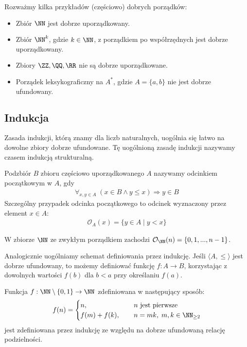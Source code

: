 \begin{example}
    Rozważmy kilka przykładów (częściowo) dobrych porządków:
    \begin{itemize}
        \item Zbiór $\NN$ jest dobrze uporządkowany.
        \item Zbiór $\NN^k$, gdzie $k \in \NN$, z porządkiem po współrzędnych jest dobrze uporządkowany.
        \item Zbiory $\ZZ, \QQ, \RR$ nie są dobrze uporządkowane.
        \item Porządek leksykograficzny na $A^*$, gdzie $A = \{a, b\}$ nie jest dobrze ufundowany.
    \end{itemize}
\end{example}

\subsection{Indukcja}
Zasada indukcji, którą znamy dla liczb naturalnych, uogólnia się łatwo na dowolne zbiory dobrze ufundowane. Tę uogólnioną zasadę indukcji nazywamy czasem indukcją strukturalną.

Podzbiór $B$ zbioru częściowo uporządkowanego $A$ nazywamy odcinkiem początkowym w $A$, gdy
\begin{align*}
    \forall_{x, y \in A} \; (x \in B \land y \leq x) \Rightarrow y \in B
\end{align*}
Szczególny przypadek odcinka początkowego to odcinek wyznaczony przez element $x \in A$:
\begin{align*}
    \mathcal{O}_A(x) = \{ y \in A \; | \; y < x \}
\end{align*}

\begin{example}
    W zbiorze $\NN$ ze zwykłym porządkiem zachodzi $\mathcal{O}_{\NN}(n) = \{0, 1, ..., n - 1\}$.
\end{example}

Analogicznie uogólniamy schemat definiowania przez indukcję. Jeśli $\langle A, \leq \rangle$ jest dobrze ufundowany, to możemy definiować funkcję $f: A \to B$, korzystając z dowolnych wartości $f (b)$ dla $b < a$ przy określaniu $f(a)$.

\begin{example}
    Funkcja $f: \NN \setminus \{0, 1\} \to \NN$ zdefiniowana w następujący sposób:
    \begin{align*}
        f(n) = \begin{cases}
            n, \hspace{60pt} & n \text{ jest pierwsze} \\
            f(m) + f(k), & n = mk, \; m, k \in \NN_{\geq 2}
        \end{cases}
    \end{align*}
jest zdefiniowana przez indukcję ze względu na dobrze ufundowaną relację podzielności.
\end{example}


